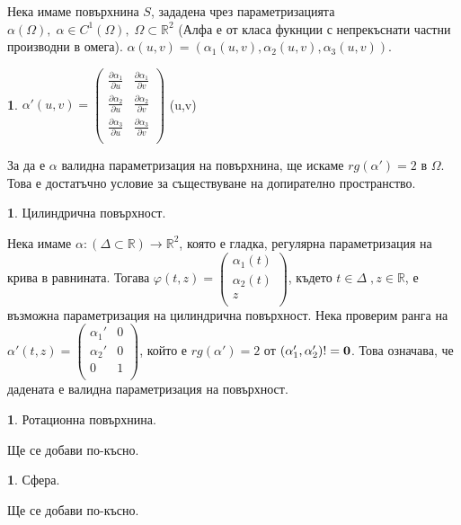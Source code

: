 \documentclass[11pt]{article}
\numberwithin{equation}{section}
\numberwithin{figure}{section}
\numberwithin{table}{section}
\theoremstyle{plain}
\theoremstyle{definition}
\newtheorem{defn}[thm]{\protect\definitionname}
\theoremstyle{remark}
\theoremstyle{definition}
\theoremstyle{remark}
\theoremstyle{plain}
\theoremstyle{definition}
\theoremstyle{definition}
\newtheorem{example}[thm]{\protect\examplename}
\theoremstyle{plain}
\theoremstyle{plain}
\theoremstyle{plain}
\theoremstyle{definition}
\theoremstyle{plain}
\providecommand{\definitionname}{Дефиниция}
\providecommand{\examplename}{Пример}
\newcommand*{\R}{\mathbb{R}}
\newcommand*{\p}{\partial}
\begin{document}
Нека имаме повърхнина $S$, зададена чрез параметризацията $\alpha (\Omega ), \; \alpha \in C^1 (\Omega ), \; \Omega \subset \R^2$ (Алфа е от класа фукнции с непрекъснати частни производни в омега). $\alpha(u,v) = \left(\alpha_1 (u,v), \alpha_2 (u,v), \alpha_3 (u,v)\right)$.

\begin{defn}
$\alpha '(u,v) = \begin{pmatrix}
	\frac{\p\alpha_1}{\p u} & \frac{\p\alpha_1}{\p v}\\
	\frac{\p\alpha_2}{\p u} & \frac{\p\alpha_2}{\p v}\\
	\frac{\p\alpha_3}{\p u} & \frac{\p\alpha_3}{\p v}\\
\end{pmatrix}$ (u,v)
\end{defn}

За да е $\alpha$ валидна параметризация на повърхнина, ще искаме $rg(\alpha') = 2$ в $\Omega$. Това е достатъчно условие за съществуване на допирателно пространство.

\begin{example} Цилиндрична повърхност.

Нека имаме $\alpha:(\Delta\subset \R)\rightarrow \R^2$, която е гладка, регулярна параметризация на крива в равнината. Тогава $\varphi(t,z) = \begin{pmatrix}
	\alpha_1(t)\\
	\alpha_2(t)\\
	z\\
\end{pmatrix}$, където $t\in\Delta \;, z\in\R$, е възможна параметризация на цилиндрична повърхност. Нека проверим ранга на $\alpha'(t,z) = \begin{pmatrix}
	\alpha_1' & 0\\
	\alpha_2' & 0\\
	0 & 1\\
\end{pmatrix}$, който е $rg(\alpha') = 2$ от $(\alpha_1', \alpha_2') != \bold{0}$. Това означава, че дадената е валидна параметризация на повърхност.
\end{example}

\begin{example} Ротационна повърхнина.

Ще се добави по-късно.
\end{example}

\begin{example} Сфера.

Ще се добави по-късно.
\end{example}
\end{document}
